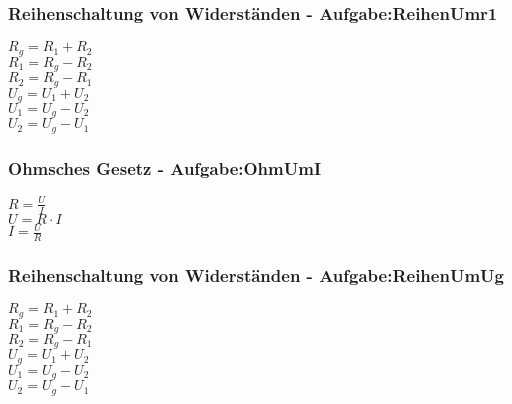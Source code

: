 \subsubsection{Reihenschaltung von Widerständen - Aufgabe:ReihenUmr1} 
\begin{minipage}{0.45\textwidth} 
$ R_{g}  = R_{1}  + R_{2} $\\ 
$ R_{1}  = R_{g}  - R_{2} $\\ 
$ R_{2}  = R_{g}  - R_{1} $\\ 
$ U_{g}  = U_{1}  + U_{2} $\\ 
$ U_{1}  = U_{g}  - U_{2} $\\ 
$ U_{2}  = U_{g}  - U_{1} $\\ 
\end{minipage} 
\begin{minipage}{0.45\textwidth} 
 
\end{minipage} 
\subsubsection{Ohmsches Gesetz - Aufgabe:OhmUmI} 
\begin{minipage}{0.45\textwidth} 
$ R = \frac{U}{I} $\\ 
$ U = R\cdot I $\\ 
$ I = \frac{U}{R} $\\ 
\end{minipage} 
\begin{minipage}{0.45\textwidth} 
 
\end{minipage} 
\subsubsection{Reihenschaltung von Widerständen - Aufgabe:ReihenUmUg} 
\begin{minipage}{0.45\textwidth} 
$ R_{g}  = R_{1}  + R_{2} $\\ 
$ R_{1}  = R_{g}  - R_{2} $\\ 
$ R_{2}  = R_{g}  - R_{1} $\\ 
$ U_{g}  = U_{1}  + U_{2} $\\ 
$ U_{1}  = U_{g}  - U_{2} $\\ 
$ U_{2}  = U_{g}  - U_{1} $\\ 
\end{minipage} 
\begin{minipage}{0.45\textwidth} 
 
\end{minipage} 

